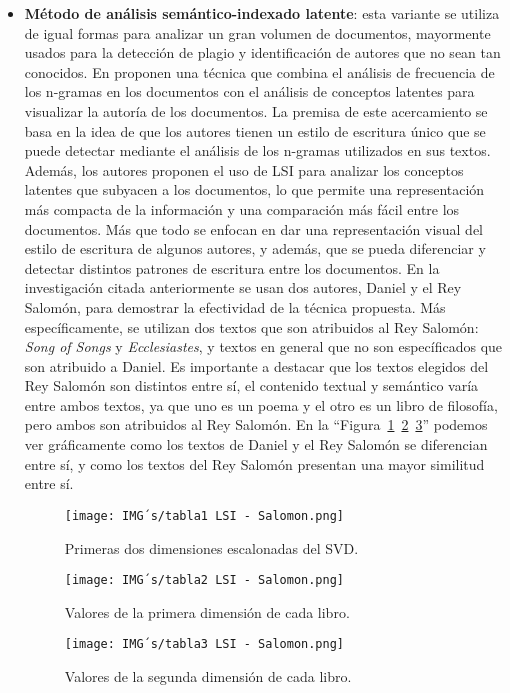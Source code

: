 \documentclass[12pt, conference]{IEEEtran}
\begin{document}
\begin{itemize}
  \item \textbf{Método de análisis semántico-indexado latente}: esta variante se utiliza de igual formas para analizar un gran volumen de documentos, mayormente usados para la detección de plagio y identificación de autores que no sean tan conocidos. En \cite{f10} proponen una técnica que combina el análisis de frecuencia de los n-gramas en los documentos con el análisis de conceptos latentes para visualizar la autoría de los documentos. La premisa de este acercamiento se basa en la idea de que los autores tienen un estilo de escritura único que se puede detectar mediante el análisis de los n-gramas utilizados en sus textos. Además, los autores proponen el uso de LSI para analizar los conceptos latentes que subyacen a los documentos, lo que permite una representación más compacta de la información y una comparación más fácil entre los documentos. Más que todo se enfocan en dar una representación visual del estilo de escritura de algunos autores, y además, que se pueda diferenciar y detectar distintos patrones de escritura entre los documentos. En la investigación citada anteriormente se usan dos autores, Daniel y el Rey Salomón, para demostrar la efectividad de la técnica propuesta. Más específicamente, se utilizan dos textos que son atribuidos al Rey Salomón: \textit{Song of Songs} y \textit{Ecclesiastes}, y textos en general que no son específicados que son atribuido a Daniel. Es importante a destacar que los textos elegidos del Rey Salomón son distintos entre sí, el contenido textual y semántico varía entre ambos textos, ya que uno es un poema y el otro es un libro de filosofía, pero ambos son atribuidos al Rey Salomón. En la ``Figura~\ref{fig7}~\ref{fig8}~\ref{fig9}'' podemos ver gráficamente como los textos de Daniel y el Rey Salomón se diferencian entre sí, y como los textos del Rey Salomón presentan una mayor similitud entre sí.
  \begin{figure}[htbp]
    \caption{Primeras dos dimensiones escalonadas del SVD.}
    \centerline{\texttt{[image: IMG´s/tabla1 LSI - Salomon.png]}}
    \label{fig7}
  \end{figure}
  \begin{figure}[htbp]
    \caption{Valores de la primera dimensión de cada libro.}
    \centerline{\texttt{[image: IMG´s/tabla2 LSI - Salomon.png]}}
    \label{fig8}
  \end{figure}
  \begin{figure}[htbp]
    \caption{Valores de la segunda dimensión de cada libro.}
    \centerline{\texttt{[image: IMG´s/tabla3 LSI - Salomon.png]}}
    \label{fig9}
  \end{figure}
\end{itemize}
\end{document}

